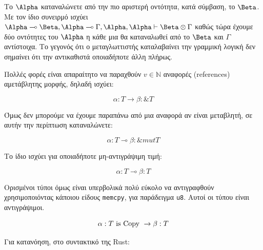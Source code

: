 Το $\Alpha$ καταναλώνετε από την πιο αριστερή οντότητα, κατά σύμβαση, το $\Beta$.
Με τον ίδιο συνειρμό ισχύει  $\Alpha \multimap \Beta,\Alpha \multimap \Gamma, \Alpha,\Alpha \vdash \Beta \otimes \Gamma$
καθώς τώρα έχουμε δύο οντότητες του $\Alpha$ η κάθε μια θα καταναλωθεί από το $\Beta$ και $\Gamma$ αντίστοιχα. Το γεγονός
ότι ο μεταγλωττιστής καταλαβαίνει την γραμμική λογική δεν σημαίνει ότι την αντικαθιστά οποιαδήποτε άλλη πλήρως.

Πολλές φορές είναι απαραίτητο να παραχθούν $v\in\mathbb{N} $ αναφορές (references) αμετάβλητης μορφής, δηλαδή ισχύει:

\begin{equation}
\alpha:T \rightarrow \beta: \&T
\end{equation}

Όμως δεν μπορούμε να έχουμε παραπάνω από μια αναφορά αν είναι μεταβλητή, σε αυτήν την περίπτωση καταναλώνετε:

\begin{equation}
\alpha:T \multimap \beta: \& mut T
\end{equation}

Το ίδιο ισχύει για οποιαδήποτε μη-αντιγράψιμη τιμή:

\begin{equation}
\alpha:T \multimap \beta: T
\end{equation}

Ορισμένοι τύποι όμως είναι υπερβολικά πολύ εύκολο να αντιγραφθούν χρησιμοποιόντας κάποιου είδους
\verb|memcpy|, για παράδειγμα \verb|u8|. Αυτοί οι τύπου είναι αντιγράψιμοι.

\begin{equation}
\alpha:T \textup{ is Copy } \rightarrow \beta:T
\end{equation}

Για κατανόηση, στο συντακτικό της Rust:

